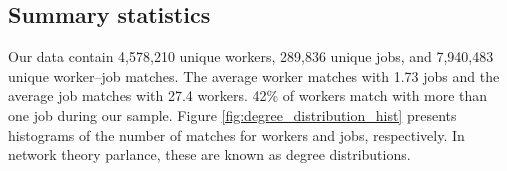 \documentclass[12pt]{article}
\theoremstyle{definition}
\theoremstyle{plain}
\begin{document}

\subsection{Summary statistics}



Our data contain 4,578,210 unique workers, 289,836 unique jobs, and 7,940,483 unique worker--job matches. The average worker matches with 1.73 jobs and the average job matches with 27.4 workers. 42\% of workers match with more than one job during our sample. Figure \ref{fig:degree_distribution_hist} presents histograms of the number of matches for workers and jobs, respectively. In network theory parlance, these are known as degree distributions. 
\end{document}

